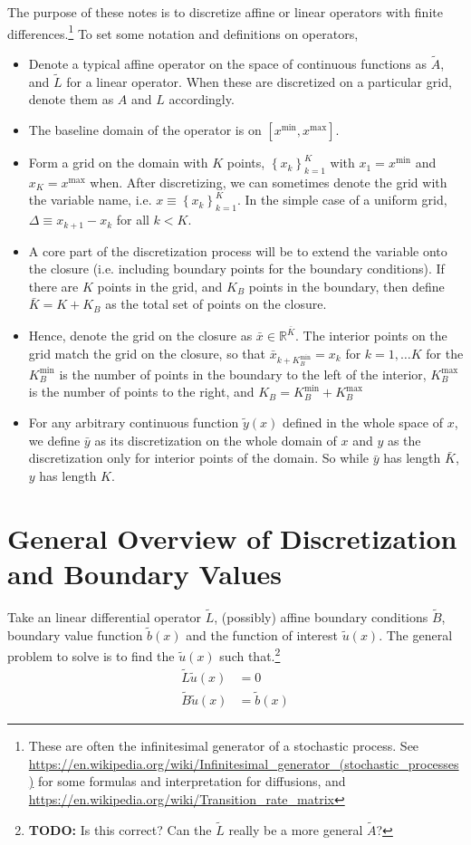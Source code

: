 \documentclass[11pt]{article}
\newcommand{\set}[1]{\ensuremath{\left\{{#1}\right\}}}
\newcommand{\R}{\ensuremath{\mathbb{R}}}
\begin{document}
	The purpose of these notes is to discretize affine or linear operators with finite differences.\footnote{These are often the infinitesimal generator of a stochastic process.  See \url{https://en.wikipedia.org/wiki/Infinitesimal_generator_(stochastic_processes)} for some formulas and interpretation for diffusions, and \url{https://en.wikipedia.org/wiki/Transition_rate_matrix}} To set some notation and definitions on operators,
	\begin{itemize}
		\item Denote a typical affine operator on the space of continuous functions as $\tilde{A}$, and $\tilde{L}$ for a linear operator.  When these are discretized on a particular grid, denote them as $A$ and $L$ accordingly.
		\item The baseline domain of the operator is on $[x^{\min}, x^{\max}]$.
		\item Form a grid on the domain with $K$ points, $\set{x_k}_{k=1}^{K}$ with $x_1 = x^{\min}$ and $x_{K} = x^{\max}$ when. After discretizing, we can sometimes denote the grid with the variable name, i.e. $x \equiv \set{x_k}_{k=1}^K$. In the simple case of a uniform grid, $\Delta \equiv x_{k+1} - x_k$ for all $k < K$.
		\item A core part of the discretization process will be to extend the variable onto the closure (i.e. including boundary points for the boundary conditions).  If there are $K$ points in the grid, and $K_B$ points in the boundary, then define $\bar{K} = K + K_B$ as the total set of points on the closure.
		\item Hence, denote the grid on the closure as $\bar{x} \in \R^{\bar{K}}$.  The interior points on the grid match the grid on the closure, so that $\bar{x}_{k+K^{\min}_B} = x_{k}$ for $k = 1, \ldots K$ for the $K^{\min}_B$ is the number of points in the boundary to the left of the interior, $K^{\max}_B$ is the number of points to the right, and $K_B = K^{\min}_B + K^{\max}_B$
		\item For any arbitrary continuous function $\tilde{y}(x)$ defined in the whole space of $x$, we define $\bar{y}$ as its discretization on the whole domain of $x$ and $y$ as the discretization only for interior points of the domain. So while $\bar{y}$ has length $\bar{K}$, $y$ has length $K$.
	\end{itemize}

	\section{General Overview of Discretization and Boundary Values}\label{sec:general}
	Take an linear differential operator $\tilde{L}$, (possibly) affine boundary conditions $\tilde{B}$, boundary value function $\tilde{b}(x)$ and the function of interest $\tilde{u}(x)$.  The general problem to solve is to find the $\tilde{u}(x)$ such that.\footnote{\textbf{TODO:} Is this correct? Can the $\tilde{L}$ really be a more general $\tilde{A}$?}
	\begin{align}
		\tilde{L} \tilde{u}(x) &= 0\\
		\tilde{B} \tilde{u}(x) &= \tilde{b}(x)
	\end{align}
\end{document}
